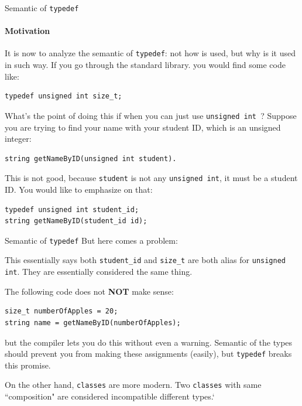 \begin{frame}[fragile]{Semantic of \texttt{typedef}}
\framesubtitle{Motivation}
It is now to analyze the semantic of \texttt{typedef}: not how is used, but why is it used in such way. If you go through the standard library. you would find some code like:
\begin{verbatim}
typedef unsigned int size_t;
\end{verbatim}
What's the point of doing this if when you can just use \texttt{unsigned int }? Suppose you are trying to find your name with your student ID, which is an unsigned integer:
\begin{verbatim}
string getNameByID(unsigned int student). 
\end{verbatim}
This is not good, because \texttt{student} is not any \texttt{unsigned int}, it must be a student ID. You would like to emphasize on that:
\begin{verbatim}
typedef unsigned int student_id; 
string getNameByID(student_id id);
\end{verbatim}
\end{frame}

\begin{frame}[fragile]{Semantic of \texttt{typedef}}
But here comes a problem:
\begin{center}
\end{center}
This essentially says both \texttt{student\_id} and \texttt{size\_t} are both alias for \texttt{unsigned int}. They are essentially considered the same thing.

The following code does not \textbf{NOT} make sense:

\begin{verbatim}
size_t numberOfApples = 20;
string name = getNameByID(numberOfApples);
\end{verbatim}

but the compiler lets you do this without even a warning. Semantic of the types should prevent you from making these assignments (easily), but \texttt{typedef} breaks this promise.

On the other hand, \texttt{classes} are more modern. Two \texttt{classes} with same ``composition" are considered incompatible different types.`

\end{frame}

